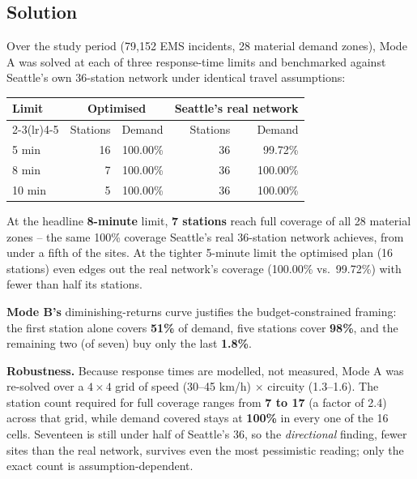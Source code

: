 \documentclass[11pt]{article}
\begin{document}
\subsection*{Solution}
Over the study period (79{,}152 EMS incidents, 28 material demand zones),
Mode A was solved at each of three response-time limits and benchmarked
against Seattle's own 36-station network under identical travel assumptions:

\begin{table}[h]
\centering
\small
\begin{tabular}{@{}lrrrr@{}}
\toprule
\textbf{Limit} & \multicolumn{2}{c}{\textbf{Optimised}} & \multicolumn{2}{c}{\textbf{Seattle's real network}} \\
\cmidrule(lr){2-3}\cmidrule(lr){4-5}
 & Stations & Demand & Stations & Demand \\
\midrule
5 min  & 16 & 100.00\% & 36 & 99.72\% \\
8 min  &  7 & 100.00\% & 36 & 100.00\% \\
10 min &  5 & 100.00\% & 36 & 100.00\% \\
\bottomrule
\end{tabular}
\end{table}

At the headline \textbf{8-minute} limit, \textbf{7 stations} reach full
coverage of all 28 material zones -- the same 100\% coverage Seattle's real
36-station network achieves, from under a fifth of the sites. At the tighter
5-minute limit the optimised plan (16 stations) even edges out the real
network's coverage (100.00\% vs.\ 99.72\%) with fewer than half its stations.

\textbf{Mode B's} diminishing-returns curve justifies the budget-constrained
framing: the first station alone covers \textbf{51\%} of demand, five
stations cover \textbf{98\%}, and the remaining two (of seven) buy only the
last \textbf{1.8\%}.

\textbf{Robustness.} Because response times are modelled, not measured, Mode
A was re-solved over a $4\times4$ grid of speed (30--45 km/h) $\times$
circuity (1.3--1.6). The station count required for full coverage ranges
from \textbf{7 to 17} (a factor of 2.4) across that grid, while demand
covered stays at \textbf{100\%} in every one of the 16 cells. Seventeen is
still under half of Seattle's 36, so the \emph{directional} finding, fewer
sites than the real network, survives even the most pessimistic reading;
only the exact count is assumption-dependent.
\end{document}

